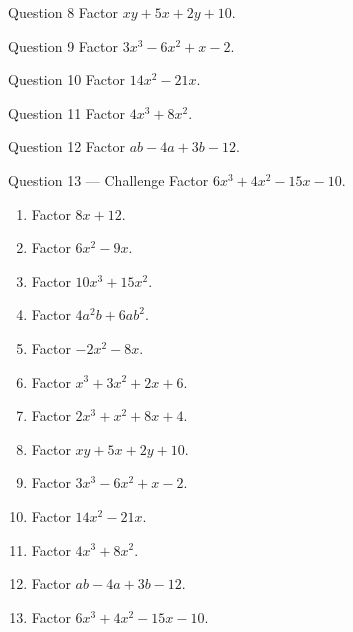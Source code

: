 \documentclass[11pt]{article}
\begin{document}
\begin{qbox}{Question 8}
Factor $xy+5x+2y+10$.\workspace{2.2cm}
\end{qbox}

\begin{qbox}{Question 9}
Factor $3x^3-6x^2+x-2$.\workspace{2.2cm}
\end{qbox}

\begin{qbox}{Question 10}
Factor $14x^2-21x$.\workspace{1.8cm}
\end{qbox}

\begin{qbox}{Question 11}
Factor $4x^3+8x^2$.\workspace{1.8cm}
\end{qbox}

\begin{qbox}{Question 12}
Factor $ab-4a+3b-12$.\workspace{2.2cm}
\end{qbox}

\begin{qbox}{Question 13 --- Challenge}
Factor $6x^3+4x^2-15x-10$.\workspace{2.6cm}
\end{qbox}

\clearpage
{}

\begin{recapbox}
\begin{multicols}{2}
\small
\begin{enumerate}[leftmargin=*,itemsep=3pt]
  \item Factor $8x+12$.
  \item Factor $6x^2-9x$.
  \item Factor $10x^3+15x^2$.
  \item Factor $4a^2b+6ab^2$.
  \item Factor $-2x^2-8x$.
  \item Factor $x^3+3x^2+2x+6$.
  \item Factor $2x^3+x^2+8x+4$.
  \item Factor $xy+5x+2y+10$.
  \item Factor $3x^3-6x^2+x-2$.
  \item Factor $14x^2-21x$.
  \item Factor $4x^3+8x^2$.
  \item Factor $ab-4a+3b-12$.
  \item Factor $6x^3+4x^2-15x-10$.
\end{enumerate}
\end{multicols}
\end{recapbox}
\end{document}
